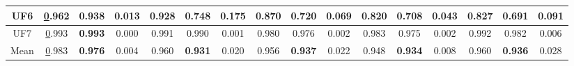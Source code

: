 \begin{table*}[t]
\begin{tabular}{c|c|c|c|c|c|c|c|c|c|c|c|c|c|c|c|}
\multicolumn{1}{|c|}{UF6} & {\ul 0.962} & \textbf{0.938} & 0.013 & 0.928 & 0.748 & 0.175 & 0.870 & 0.720 & 0.069 & 0.820 & 0.708 & 0.043 & 0.827 & 0.691 & 0.091 \\ \hline
\multicolumn{1}{|c|}{UF7} & {\ul 0.993} & \textbf{0.993} & 0.000 & 0.991 & 0.990 & 0.001 & 0.980 & 0.976 & 0.002 & 0.983 & 0.975 & 0.002 & 0.992 & 0.982 & 0.006 \\ \hline
\multicolumn{1}{|c|}{Mean} & {\ul 0.983} & \textbf{0.976} & 0.004 & 0.960 & \textbf{0.931} & 0.020 & 0.956 & \textbf{0.937} & 0.022 & 0.948 & \textbf{0.934} & 0.008 & 0.960 & \textbf{0.936} & 0.028 \\ \hline
\end{tabular}%
\end{table*}

